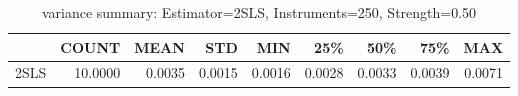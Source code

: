 \begin{table}[ht]
\centering
\caption{variance summary: Estimator=2SLS, Instruments=250, Strength=0.50}
\begin{tabular}{lrrrrrrrr}
\toprule
 & COUNT & MEAN & STD & MIN & 25\% & 50\% & 75\% & MAX \\
\midrule
2SLS & 10.0000 & 0.0035 & 0.0015 & 0.0016 & 0.0028 & 0.0033 & 0.0039 & 0.0071 \\
\bottomrule
\end{tabular}
\end{table}
